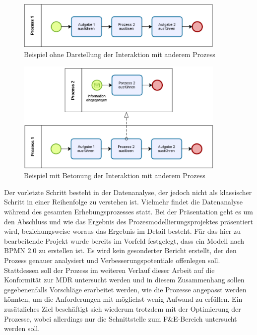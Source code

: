 \documentclass[a4paper,12pt]{report}
\begin{document}
\begin{figure}[ht]
\centering
\includegraphics[width=0.9\textwidth]{Images/modellierungstiefe1}
\caption[Beispiel ohne Darstellung der Interaktion mit anderem Prozess]{Beispiel ohne Darstellung der Interaktion mit anderem Prozess}
\label{modellierungstiefe_flach}
\end{figure}
\begin{figure}[ht]
\centering
\includegraphics[width=0.9\textwidth]{Images/modellierungstiefe2}
\caption[Beispiel mit Betonung der Interaktion mit anderem Prozess]{Beispiel mit Betonung der Interaktion mit anderem Prozess}
\label{modellierungstiefe_tiefer}
\end{figure}

Der vorletzte Schritt besteht in der Datenanalyse, der jedoch nicht als klassischer Schritt in einer Reihenfolge zu verstehen ist. Vielmehr findet die Datenanalyse während des gesamten Erhebungsprozesses statt. Bei der Präsentation geht es um den Abschluss und wie das Ergebnis des Prozesmodellierungsprojektes präsentiert wird, beziehungsweise woraus das Ergebnis im Detail besteht. Für das hier zu bearbeitende Projekt wurde bereits im Vorfeld festgelegt, dass ein Modell nach BPMN 2.0 zu erstellen ist. Es wird kein gesonderter Bericht erstellt, der den Prozess genauer analysiert und Verbesserungspotentiale offenlegen soll. Stattdessen soll der Prozess im weiteren Verlauf dieser Arbeit auf die Konformität zur MDR untersucht werden und in diesem Zusammenhang sollen gegebenenfalls Vorschläge erarbeitet werden, wie die Prozesse angepasst werden könnten, um die Anforderungen mit möglichst wenig Aufwand zu erfüllen. Ein zusätzliches Ziel beschäftigt sich wiederum trotzdem mit der Optimierung der Prozesse, wobei allerdings nur die Schnittstelle zum F\&E-Bereich untersucht werden soll.
\end{document}
